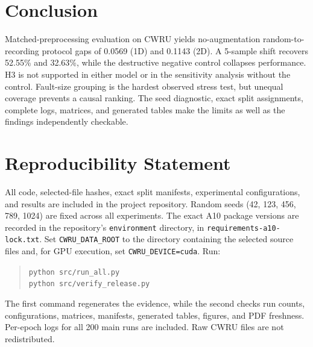 ﻿\documentclass[11pt,a4paper]{article}
\begin{document}
\section{Conclusion}

Matched-preprocessing evaluation on CWRU yields no-augmentation random-to-recording protocol gaps of 0.0569 (1D) and 0.1143 (2D). A 5-sample shift recovers 52.55\% and 32.63\%, while the destructive negative control collapses performance. H3 is not supported in either model or in the sensitivity analysis without the control. Fault-size grouping is the hardest observed stress test, but unequal coverage prevents a causal ranking. The seed diagnostic, exact split assignments, complete logs, matrices, and generated tables make the limits as well as the findings independently checkable.

\section{Reproducibility Statement}

All code, selected-file hashes, exact split manifests, experimental configurations, and results are included in the project repository. Random seeds (42, 123, 456, 789, 1024) are fixed across all experiments. The exact A10 package versions are recorded in the repository's \texttt{environment} directory, in \texttt{requirements-a10-lock.txt}. Set \texttt{CWRU\_DATA\_ROOT} to the directory containing the selected source files and, for GPU execution, set \texttt{CWRU\_DEVICE=cuda}. Run:
\begin{quote}
\small
\texttt{python src/run\_all.py}\\
\texttt{python src/verify\_release.py}
\end{quote}
The first command regenerates the evidence, while the second checks run counts, configurations, matrices, manifests, generated tables, figures, and PDF freshness. Per-epoch logs for all 200 main runs are included. Raw CWRU files are not redistributed.
\end{document}
